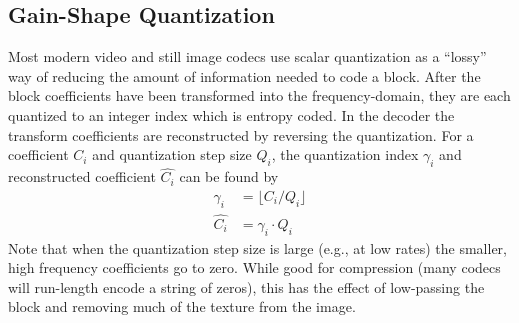 \documentclass[conference, 10pt]{IEEEtran}
\begin{document}
%
%
%
%
%
%

\subsection{Gain-Shape Quantization}
\label{sec:pvq}

Most modern video and still image codecs use scalar quantization as a ``lossy''
 way of reducing the amount of information needed to code a block.
After the block coefficients have been transformed into the frequency-domain,
 they are each quantized to an integer index which is entropy coded.
In the decoder the transform coefficients are reconstructed by reversing the
 quantization.
For a coefficient $C_i$ and quantization step size $Q_i$, the quantization
 index $\gamma_i$ and reconstructed coefficient $\hat{C_i}$ can be found by
\begin{align}
\gamma_i & = \lfloor C_i / Q_i\rfloor \\
\hat{C_i} & = \gamma_i\cdot Q_i
\end{align}
Note that when the quantization step size is large (e.g., at low rates) the
 smaller, high frequency coefficients go to zero.
While good for compression (many codecs will run-length encode a string of
 zeros), this has the effect of low-passing the block and removing much of the
 texture from the image.
\end{document}
